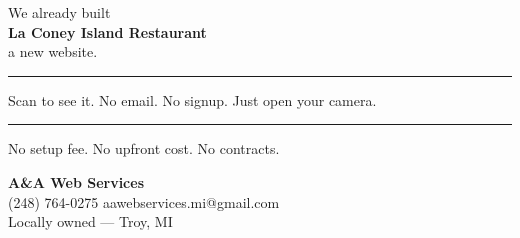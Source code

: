 \documentclass[11pt,letterpaper]{article}
\begin{document}
\begin{center}

\newcommand{\businessname}{La Coney Island Restaurant}

\vspace*{0.1in}

{\fontsize{18}{22}\selectfont We already built}\\[0.1in]
{\fontsize{44}{48}\selectfont\bfseries \businessname}\\[0.1in]
{\fontsize{18}{22}\selectfont a new website.}

\vspace{0.3in}
\noindent\rule{\linewidth}{0.8pt}
\vspace{0.3in}

{\fontsize{15}{19}\selectfont Scan to see it. No email. No signup. Just open your camera.}

\vspace{0.35in}


\vspace{0.35in}
\noindent\rule{\linewidth}{0.8pt}
\vspace{0.3in}

{\fontsize{14}{18}\selectfont No setup fee. No upfront cost. No contracts.}

\vspace{0.3in}

{\fontsize{20}{24}\selectfont\bfseries A\&A Web Services}\\[0.15in]
{\fontsize{15}{19}\selectfont (248) 764-0275 \quad aawebservices.mi@gmail.com}\\[0.1in]
{\fontsize{12}{16}\selectfont Locally owned --- Troy, MI}

\vspace*{\fill}

\end{center}
\hfill{\color{gray!70}\fontsize{5}{6}}
\end{document}

